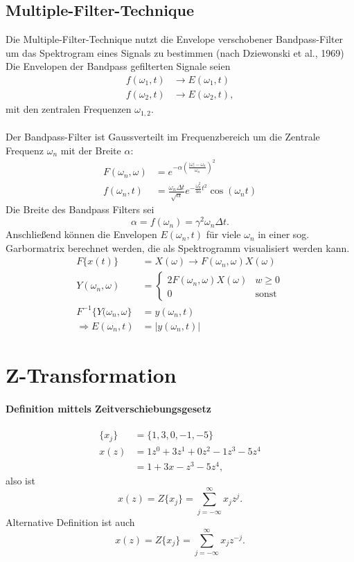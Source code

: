 \subsection{Multiple-Filter-Technique}
Die Multiple-Filter-Technique nutzt die Envelope verschobener Bandpass-Filter um das Spektrogram eines Signals zu bestimmen (nach Dziewonski et al., 1969)\\
Die Envelopen der Bandpass gefilterten Signale seien
\[
\begin{split}
f(\omega_1, t) & \rightarrow E(\omega_1, t)\\
f(\omega_2, t) & \rightarrow E(\omega_2, t),
\end{split}
\]
mit den zentralen Frequenzen $\omega_{1,2}$.\\\\
Der Bandpass-Filter ist Gaussverteilt im Frequenzbereich um die Zentrale Frequenz $\omega_n$ mit der Breite $\alpha$:
\[
\begin{split}
F(\omega_n, \omega) & = e^{-\alpha \left( \frac{|\omega|-\omega_n}{\omega_n} \right)^2}\\
f(\omega_n, t) & = \frac{\omega_n \Delta t}{\sqrt{\alpha}} e^{-\frac{\omega_n^2}{4\alpha} t^2} \cos (\omega_n t)
\end{split}
\]
Die Breite des Bandpass Filters sei
\[
\alpha = f(\omega_n) = \gamma^2 \omega_n \Delta t.
\]
Anschließend können die Envelopen $E(\omega_n, t)$ für viele $\omega_n$ in einer sog. Garbormatrix berechnet werden, die als Spektrogramm visualisiert werden kann.
\[
\begin{split}
F\{x(t)\} & = X(\omega) \rightarrow F(\omega_n, \omega) X(\omega)\\
Y(\omega_n, \omega) & = 
\begin{cases}
2 F(\omega_n, \omega) X(\omega) & w \geq 0\\
0 & \mbox{sonst}
\end{cases}\\
F^{-1}\{Y(\omega_n, \omega\} & = y(\omega_n, t)\\
\Rightarrow E(\omega_n, t) & = |y(\omega_n,t)|
\end{split}
\]

\section{Z-Transformation}
\paragraph{Definition mittels Zeitverschiebungsgesetz}
\[
\begin{split}
\{x_j\} & = \{1,3,0,-1,-5\}\\
x(z) & = 1z^0+3z^1+0z^2-1z^3-5z^4\\
& = 1+3x-z^3-5z^4,
\end{split}
\]
also ist
\begin{equation}
x(z) = Z\{x_j\} = \sum_{j=-\infty}^{\infty} x_j z^j.
\end{equation}
Alternative Definition ist auch
\[
x(z) = Z\{x_j\} = \sum_{j=-\infty}^{\infty} x_j z^{-j}.
\]
